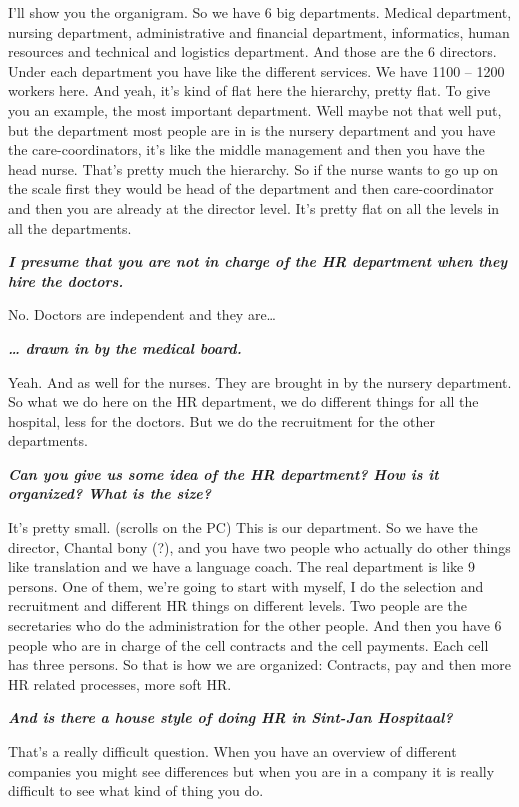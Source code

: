 \documentclass[a4paper,fleqn,11pt,dvips,titlepage]{article}
\newcommand{\question}[1]{\textbf{\textit{#1}}}
\numberwithin{figure}{section}
\numberwithin{equation}{section}
\begin{document}
I’ll show you the organigram. So we have 6 big departments. Medical department, nursing department, administrative and financial department, informatics, human resources and technical and logistics department. And those are the 6 directors. Under each department you have like the different services. We have 1100 – 1200 workers here. And yeah, it’s kind of flat here the hierarchy, pretty flat. To give you an example, the most important department. Well maybe not that well put, but the department most people are in is the nursery department and you have the care-coordinators, it’s like the middle management and then you have the head nurse. That’s pretty much the hierarchy. So if the nurse wants to go up on the scale first they would be head of the department and then care-coordinator and then you are already at the director level. It’s pretty flat on all the levels in all the departments.  

\question{I presume that you are not in charge of the HR department when they hire the doctors.}

No. Doctors are independent and they are…

\question{… drawn in by the medical board.}

Yeah. And as well for the nurses. They are brought in by the nursery department. So what we do here on the HR department, we do different things for all the hospital, less for the doctors. But we do the recruitment for the other departments. 

\question{Can you give us some idea of the HR department? How is it organized? What is the size?}

It’s pretty small. (scrolls on the PC) This is our department. So we have the director, Chantal bony (?), and you have two people who actually do other things like translation and we have a language coach. The real department is like 9 persons. One of them, we’re going to start with myself, I do the selection and recruitment and different HR things on different levels. Two people are the secretaries who do the administration for the other people. And then you have 6 people who are in charge of the cell contracts and the cell payments. Each cell has three persons. So that is how we are organized: Contracts, pay and then more HR related processes, more soft HR.  

\question{And is there a house style of doing HR in Sint-Jan Hospitaal?}

That’s a really difficult question. When you have an overview of different companies you might see differences but when you are in a company it is really difficult to see what kind of thing you do. 
\end{document}
